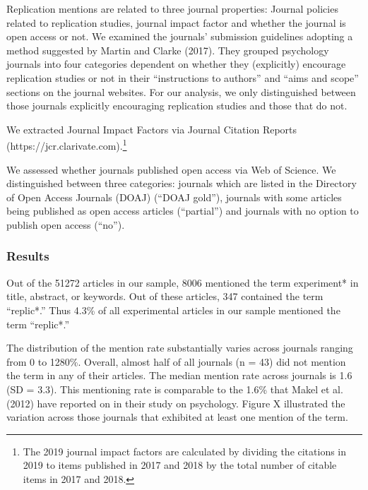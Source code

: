 \documentclass[]{elsarticle} %
\begin{document}
Replication mentions are related to three journal properties: Journal
policies related to replication studies, journal impact factor and
whether the journal is open access or not. We examined the journals'
submission guidelines adopting a method suggested by Martin and Clarke
(2017). They grouped psychology journals into four categories dependent
on whether they (explicitly) encourage replication studies or not in
their ``instructions to authors'' and ``aims and scope'' sections on the
journal websites. For our analysis, we only distinguished between those
journals explicitly encouraging replication studies and those that do
not.

We extracted Journal Impact Factors via Journal Citation Reports
(https://jcr.clarivate.com).\footnote{The 2019 journal impact factors
  are calculated by dividing the citations in 2019 to items published in
  2017 and 2018 by the total number of citable items in 2017 and 2018.}

We assessed whether journals published open access via Web of Science.
We distinguished between three categories: journals which are listed in
the Directory of Open Access Journals (DOAJ) (``DOAJ gold''), journals
with some articles being published as open access articles (``partial'')
and journals with no option to publish open access (``no'').

\hypertarget{results}{%
\subsubsection{Results}\label{results}}

Out of the 51272 articles in our sample, 8006 mentioned the term
experiment* in title, abstract, or keywords. Out of these articles, 347
contained the term ``replic*.'' Thus 4.3\% of all experimental articles
in our sample mentioned the term ``replic*.''

The distribution of the mention rate substantially varies across
journals ranging from 0 to 1280\%. Overall, almost half of all journals
(n = 43) did not mention the term in any of their articles. The median
mention rate across journals is 1.6 (SD = 3.3). This mentioning rate is
comparable to the 1.6\% that Makel et al. (2012) have reported on in
their study on psychology. Figure X illustrated the variation across
those journals that exhibited at least one mention of the term.
\end{document}
